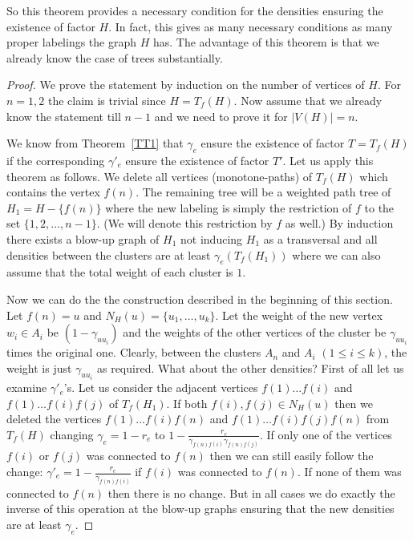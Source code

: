 \documentclass[12pt,a4paper]{amsart}
\numberwithin{equation}{section}
\begin{document}
\begin{remark} So this theorem provides a necessary condition for the densities
  ensuring the existence of factor $H$. In fact, this gives as many necessary
  conditions as many proper labelings the graph $H$ has. The advantage of this
  theorem is that we already know the case of trees substantially.
\end{remark}

\begin{proof} We prove the statement by induction on the number of vertices of
  $H$. For $n=1,2$ the claim is trivial since $H=T_f(H)$. Now assume that we
  already know the statement till $n-1$ and we need to prove it for $|V(H)|=n$. 

  We know from Theorem~\ref{TT1} that $\gamma_e$ ensure the existence of factor
  $T=T_f(H)$ if the corresponding $\gamma'_e$  ensure the existence of factor
  $T'$. Let us apply this theorem as follows. We delete all vertices
  (monotone-paths) of $T_f(H)$ which contains the vertex $f(n)$. The remaining
  tree will be a weighted path tree of $H_1=H-\{f(n)\}$ where the new labeling
  is simply the restriction of $f$ to the set $\{1,2,\dots ,n-1\}$. (We will
  denote this restriction by $f$ as well.) By  induction
  there exists a blow-up graph of $H_1$ not inducing $H_1$ as a transversal
  and all densities between the clusters are at least $\gamma_e(T_f(H_1))$
  where we can also assume that the total weight of each cluster is $1$. 

Now we can do the the construction described in the beginning of this section.  
Let $f(n)=u$ and $N_H(u)=\{u_1,\dots ,u_k\}$. Let the weight of the new vertex
 $w_i\in A_i$ be $(1-\gamma_{uu_i})$ and the weights of the other vertices of the
 cluster be $\gamma_{uu_i}$ times the original one. Clearly, between the
 clusters $A_n$ and $A_i$ $(1\leq i\leq k)$, the weight  is just
 $\gamma_{uu_i}$ as  required. 
What about the other densities? First of all let us examine $\gamma'_e$'s.
Let us consider the adjacent vertices $f(1)\dots f(i)$ and $f(1)\dots
f(i)f(j)$ of $T_f(H_1)$. If both $f(i),f(j)\in N_H(u)$ then we deleted the
vertices $f(1)\dots f(i)f(n)$ and $f(1)\dots f(i)f(j)f(n)$ from $T_f(H)$
changing $\gamma_e=1-r_e$ to
$1-\frac{r_e}{\gamma_{f(n)f(i)}\gamma_{f(n)f(j)}}$. If 
only one of the vertices  $f(i)$ or $f(j)$ was connected to $f(n)$ then we
can still easily follow the change:
$\gamma'_e=1-\frac{r_e}{\gamma_{f(n)f(i)}}$ if $f(i)$ was connected to
$f(n)$. If none of them was connected to $f(n)$ then there is no 
change. But in all cases we do exactly the inverse of this operation at the
blow-up graphs ensuring that the new densities are at least $\gamma_e$.
\end{proof}
\end{document}
